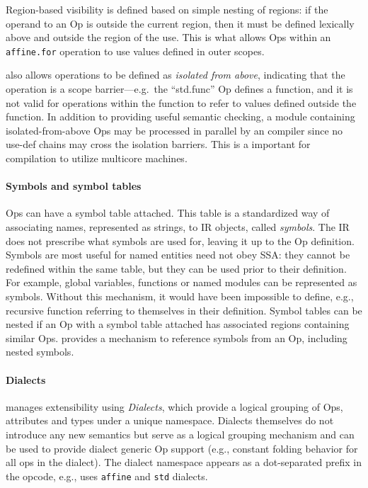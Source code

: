 Region-based visibility is defined based on simple nesting of regions:
if the operand to an Op is outside the current region, then it must be defined
lexically above and outside the region of the use.  This is what allows Ops
within an \lstinline|affine.for| operation to use values defined in outer scopes.

\MLIR also allows operations to be defined as \emph{isolated from above},
indicating that the operation
is a scope barrier---e.g.\ the ``std.func'' Op defines a function,
and it is not valid for operations within the function to refer to values
defined outside the function.  In addition to providing useful semantic
checking, a module containing isolated-from-above Ops may be processed
in parallel by an \MLIR compiler since no use-def chains may cross the
isolation barriers.  This is a important for compilation to utilize
multicore machines.

\paragraph{Symbols and symbol tables}

Ops can have a symbol table attached.  This table is a standardized way of
associating names, represented as strings, to IR objects, called \emph{symbols}. The
IR does not prescribe what symbols are used for, leaving it up to the Op
definition. Symbols are most useful for named entities need not obey SSA: they
cannot be redefined within the same table, but they can be used prior to their
definition. For example, global variables, functions or named modules can be
represented as symbols. Without this mechanism, it would have been impossible
to define, e.g., recursive function referring to themselves in their
definition. Symbol tables
can be nested if an Op with a symbol table attached has associated regions
containing similar Ops. \MLIR provides a mechanism to reference symbols from an
Op, including nested symbols.

\paragraph{Dialects}\label{sec:dialects}

\MLIR manages extensibility using \emph{Dialects}, which provide a logical
grouping of Ops, attributes and types under a unique namespace. Dialects
themselves do not introduce any new semantics but serve as a logical grouping
mechanism and can be used to provide dialect generic Op support (e.g.,
constant folding behavior for all ops in the dialect). The dialect namespace
appears as a dot-separated
prefix in the opcode, e.g.,  uses \lstinline|affine| and
\lstinline|std| dialects.

